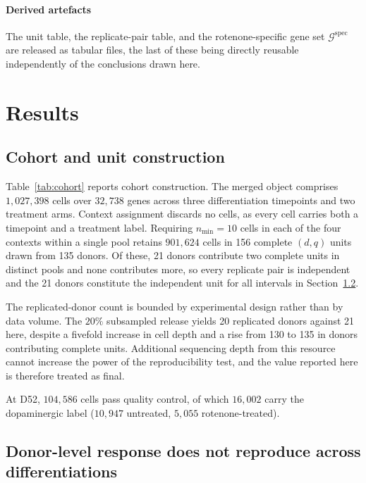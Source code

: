 \documentclass[5p,times,twocolumn]{elsarticle}
\begin{document}
\paragraph{\textbf{Derived artefacts}} The unit table, the replicate-pair table,
and the rotenone-specific gene set $\mathcal{G}^{\mathrm{spec}}$ are released as
tabular files, the last of these being directly reusable independently of the
conclusions drawn here.



\section{\textbf{Results}}
\label{sec:results}

\subsection{\textbf{Cohort and unit construction}}

Table~\ref{tab:cohort} reports cohort construction. The merged object comprises
$1{,}027{,}398$ cells over $32{,}738$ genes across three differentiation
timepoints and two treatment arms. Context assignment discards no cells, as
every cell carries both a timepoint and a treatment label. Requiring
$n_{\min}=10$ cells in each of the four contexts within a single pool retains
$901{,}624$ cells in 156 complete $(d,q)$ units drawn from 135 donors. Of
these, 21 donors contribute two complete units in distinct pools and none
contributes more, so every replicate pair is independent and the 21 donors
constitute the independent unit for all intervals in
Section~\ref{sec:res-repro}.

The replicated-donor count is bounded by experimental design rather than by data
volume. The $20\%$ subsampled release yields 20 replicated donors against 21
here, despite a fivefold increase in cell depth and a rise from 130 to 135 in
donors contributing complete units. Additional sequencing depth from this
resource cannot increase the power of the reproducibility test, and the value
reported here is therefore treated as final.

At D52, $104{,}586$ cells pass quality control, of which $16{,}002$ carry the
dopaminergic label ($10{,}947$ untreated, $5{,}055$ rotenone-treated).

\subsection{\textbf{Donor-level response does not reproduce across differentiations}}
\label{sec:res-repro}
\end{document}
